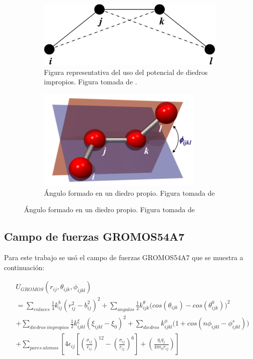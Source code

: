 \begin{figure}[!h]
\begin{subfigure}{.5\textwidth}
  \centering
  \includegraphics[width=.8\linewidth]{MD/improperdihedralanglepotential.png}  
  \caption{Figura representativa del uso del potencial de diedros impropios. Figura tomada de \cite{gromacsdoc}.}
  \label{fig:improperdihedralanglepotential}
\end{subfigure}
\begin{subfigure}{.5\textwidth}
  \centering
  \includegraphics[width=.8\linewidth]{MD/properdihedral.png}  
  \caption{Ángulo formado en un diedro propio. Figura tomada de \cite{charmmgui}}
  \label{fig:properdihedral}
\end{subfigure}
\end{figure}

\subsection{Campo de fuerzas GROMOS54A7}

Para este trabajo se usó el campo de fuerzas GROMOS54A7 que se muestra a continuación:

\begin{equation}
\begin{split}
    &{U}_{GROMOS}(r_{ij},\theta_{ijk},\phi_{ijkl})\\ & = \sum_{enlaces}\frac{1}{4}k_{ij}^{b}(r_{ij}^2 - b^{2}_{ij})^2 + \sum_{angulos} \frac{1}{2}k^{\theta}_{ijk}\Big(cos(\theta_{ijk}) - cos(\theta^{0}_{ijk})\Big)^2\\ 
    &+ \sum_{diedros\ impropios}\frac{1}{2}k^{\xi}_{ijkl}(\xi_{ijkl} - \xi_{0})^2 + \sum_{diedros}k^{\phi}_{ijkl}\Big(1 + cos(n\phi_{ijkl} - \phi^{s}_{ijkl}) \Big)\\ 
    &+ \sum_{pares\ atomos}\left[4\epsilon_{ij} \left[\left(\frac{\sigma_{ij}}{r_{ij}} \right)^{12} - \left(\frac{\sigma_{ij}}{r_{ij}}\right)^6 \right] + \left(\frac{q_i q_j}{4\pi \epsilon_{0} r_{ij}}\right)\right]
    \end{split}
\end{equation}

